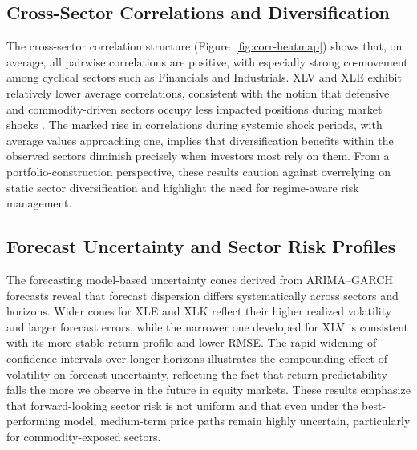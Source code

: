 \documentclass[12pt]{article}
\begin{document}
\subsection{Cross-Sector Correlations and Diversification}

The cross-sector correlation structure (Figure~\ref{fig:corr-heatmap}) shows that, on average, all pairwise correlations are positive, with especially strong co-movement among cyclical sectors such as Financials and Industrials. XLV and XLE exhibit relatively lower average correlations, consistent with the notion that defensive and commodity-driven sectors occupy less impacted positions during market shocks \cite{ewing2002}. The marked rise in correlations during systemic shock periods, with average values approaching one, implies that diversification benefits within the observed sectors diminish precisely when investors most rely on them. From a portfolio-construction perspective, these results caution against overrelying on static sector diversification and highlight the need for regime-aware risk management.

\subsection{Forecast Uncertainty and Sector Risk Profiles}

The forecasting model-based uncertainty cones derived from ARIMA–GARCH forecasts reveal that forecast dispersion differs systematically across sectors and horizons. Wider cones for XLE and XLK reflect their higher realized volatility and larger forecast errors, while the narrower one developed for XLV is consistent with its more stable return profile and lower RMSE. The rapid widening of confidence intervals over longer horizons illustrates the compounding effect of volatility on forecast uncertainty, reflecting the fact that return predictability falls the more we observe in the future in equity markets. These results emphasize that forward-looking sector risk is not uniform and that even under the best-performing model, medium-term price paths remain highly uncertain, particularly for commodity-exposed sectors.
\end{document}

